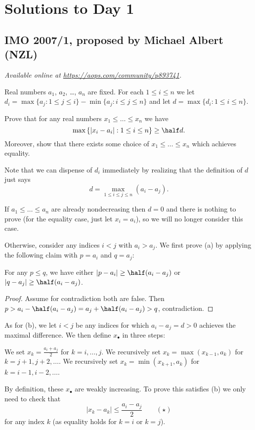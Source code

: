 \documentclass[11pt]{scrartcl}
\begin{document}
\section{Solutions to Day 1}
\subsection{IMO 2007/1, proposed by Michael Albert (NZL)}
\textsl{Available online at \url{https://aops.com/community/p893741}.}
\begin{mdframed}[style=mdpurplebox,frametitle={Problem statement}]
Real numbers $a_1$, $a_2$, \dots, $a_n$ are fixed.
For each $1 \le i \le n$ we let
$d_i = \max\{a_j : 1 \le j \le i\} - \min\{a_j : i \le j \le n\}$
and let $d = \max \{d_i : 1 \le i \le n\}$.

\begin{enumerate}[(a)]
  \ii Prove that for any real numbers $x_1 \le \dots \le x_n$ we have
  \[
    \max \left\{ \left\lvert x_i - a_i \right\rvert :
      1 \le i \le n \right\}
      \ge \half d.
  \]
  \ii Moreover, show that there exists some
  choice of $x_1 \le \dots \le x_n$ which achieves equality.
\end{enumerate}
\end{mdframed}
Note that we can dispense of $d_i$ immediately
by realizing that the definition of $d$ just says
\[ d = \max_{1 \le i \le j \le n} \left( a_i - a_j \right). \]

If $a_1 \le \dots \le a_n$ are already nondecreasing
then $d = 0$ and there is nothing to prove
(for the equality case, just let $x_i = a_i$),
so we will no longer consider this case.

Otherwise, consider any indices $i < j$ with $a_i > a_j$.
We first prove (a) by applying the following claim
with $p = a_i$ and $q = a_j$:
\begin{claim*}
  For any $p \le q$, we have
  either $|p - a_i| \ge \half(a_i-a_j)$
  or $|q - a_j| \ge \half(a_i-a_j)$.
\end{claim*}
\begin{proof}
  Assume for contradiction both are false.
  Then $p > a_i - \half(a_i-a_j)
  = a_j + \half(a_i-a_j) > q$, contradiction.
\end{proof}

As for (b), we let $i < j$ be any indices for which
$a_i - a_j = d > 0$ achieves the maximal difference.
We then define $x_\bullet$ in three steps:
\begin{itemize}
  \ii We set $x_k = \frac{a_i + a_j}{2}$ for $k = i, \dots, j$.
  \ii We recursively set $x_{k} = \max(x_{k-1}, a_k)$
  for $k = j+1, j+2, \dots$.
  \ii We recursively set $x_{k} = \min(x_{k+1}, a_k)$
  for $k = i-1, i-2, \dots$.
\end{itemize}
By definition, these $x_\bullet$ are weakly increasing.
To prove this satisfies (b) we only need to check that
\[ \left\lvert x_k - a_k \right\rvert \le \frac{a_i-a_j}{2} \qquad
  (\star) \]
for any index $k$ (as equality holds for $k = i$ or $k = j$).
\end{document}
